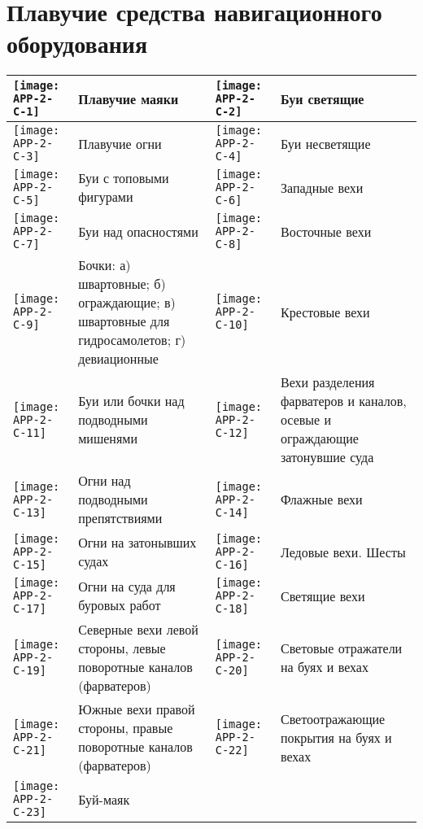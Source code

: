 \section{Плавучие средства навигационного оборудования}%

\small
\begin{longtable}{M|m{0.2\textwidth}|M|m{0.2\textwidth}}
  \toprule
  \texttt{[image: APP-2-C-1]} & Плавучие маяки &
  \texttt{[image: APP-2-C-2]} & Буи светящие \\
  \midrule
  \texttt{[image: APP-2-C-3]} & Плавучие огни &
  \texttt{[image: APP-2-C-4]} & Буи несветящие \\
  \midrule
  \texttt{[image: APP-2-C-5]} & Буи с топовыми фигурами &
  \texttt{[image: APP-2-C-6]} & Западные вехи \\
  \midrule
  \texttt{[image: APP-2-C-7]} & Буи над опасностями &
  \texttt{[image: APP-2-C-8]} & Восточные вехи \\
  \midrule
  \texttt{[image: APP-2-C-9]} & Бочки: \newline а) швартовные; \newline б) ограждающие; \newline в) швартовные для гидросамолетов; \newline г) девиационные &
  \texttt{[image: APP-2-C-10]} & Крестовые вехи \\
  \midrule
  \texttt{[image: APP-2-C-11]} & Буи или бочки над подводными мишенями &
  \texttt{[image: APP-2-C-12]} & Вехи разделения фарватеров и каналов, осевые и ограждающие затонувшие суда \\
  \midrule
  \texttt{[image: APP-2-C-13]} & Огни над подводными препятствиями &
  \texttt{[image: APP-2-C-14]} & Флажные вехи \\
  \midrule
  \texttt{[image: APP-2-C-15]} & Огни на затонывших судах &
  \texttt{[image: APP-2-C-16]} & Ледовые вехи. Шесты \\
  \midrule
  \texttt{[image: APP-2-C-17]} & Огни на суда для буровых работ &
  \texttt{[image: APP-2-C-18]} & Светящие вехи \\
  \midrule
  \texttt{[image: APP-2-C-19]} & Северные вехи левой стороны, левые поворотные каналов (фарватеров) &
  \texttt{[image: APP-2-C-20]} & Световые отражатели на буях и вехах \\
  \midrule
  \texttt{[image: APP-2-C-21]} & Южные вехи правой стороны, правые поворотные каналов (фарватеров) &
  \texttt{[image: APP-2-C-22]} & Светоотражающие покрытия на буях и вехах \\
  \midrule
  \texttt{[image: APP-2-C-23]} & Буй-маяк \\
  \bottomrule
\end{longtable}

